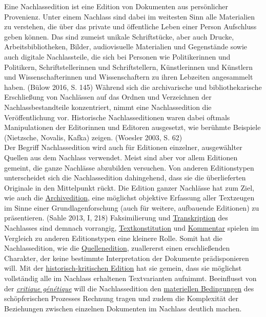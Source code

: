 \documentclass{article}
\begin{document}
    Eine Nachlassedition ist eine Edition von Dokumenten aus persönlicher Provenienz.
                  Unter einem Nachlass sind dabei im weitesten Sinn alle Materialien zu verstehen,
                  die über das private und öffentliche Leben einer Person Aufschluss geben können.
                  Das sind zumeist unikale Schriftstücke, aber auch Drucke, Arbeitsbibliotheken,
                  Bilder, audiovisuelle Materialien und Gegenstände sowie auch digitale
                  Nachlassteile, die sich bei Personen wie Politikerinnen und Politikern,
                  Schriftstellerinnen und Schriftstellern, Künstlerinnen und Künstlern und
                  Wissenschafterinnen und Wissenschaftern zu ihren Lebzeiten angesammelt haben.
                     (Bülow 2016, S. 145) Während sich die archivarische und
                  bibliothekarische Erschließung von Nachlässen auf das Ordnen und Verzeichnen der
                  Nachlassbestandteile konzentriert, nimmt eine Nachlassedition die Veröffentlichung
                  vor. Historische Nachlasseditionen waren dabei oftmals Manipulationen der
                  Editorinnen und Editoren ausgesetzt, wie berühmte Beispiele (Nietzsche, Novalis,
                  Kafka) zeigen. (Woesler 2003, S. 62)\\
            
        Der Begriff Nachlassedition wird auch für Editionen einzelner, ausgewählter
                  Quellen aus dem Nachlass verwendet. Meist sind aber vor allem Editionen gemeint,
                  die ganze Nachlässe abzubilden versuchen. Von anderen Editionstypen unterscheidet
                  sich die Nachlassedition dahingehend, dass sie die überlieferten Originale in den
                  Mittelpunkt rückt. Die Edition ganzer Nachlässe hat zum Ziel, wie auch die \href{http://gams.uni-graz.at/o:konde.33}{Archivedition}, eine möglichst
                  objektive Erfassung aller Textzeugen im Sinne einer Grundlagenforschung (auch für
                  weitere, aufbauende Editionen) zu präsentieren. (Sahle 2013, I, 218)
                  Faksimilierung und \href{http://gams.uni-graz.at/o:konde.197}{Transkription}
                  des Nachlasses sind demnach vorrangig, \href{http://gams.uni-graz.at/o:konde.28}{Textkonstitution} und \href{http://gams.uni-graz.at/o:konde.34}{Kommentar} spielen im Vergleich zu anderen Editionstypen eine kleinere
                  Rolle. Somit hat die Nachlassedition, wie die \href{http://gams.uni-graz.at/o:konde.160}{Quellenedition}, zuallererst einen erschließenden
                  Charakter, der keine bestimmte Interpretation der Dokumente prädisponieren will.
                  Mit der \href{http://gams.uni-graz.at/o:konde.93}{historisch-kritischen
                     Edition} hat sie gemein, dass sie möglichst vollständig alle im Nachlass
                  erhaltenen Textvarianten aufnimmt. Beeinflusst von der \emph{\href{http://gams.uni-graz.at/o:konde.46}{critique génétique}} will die Nachlassedition den \href{http://gams.uni-graz.at/o:konde.127}{materiellen Bedingungen} des schöpferischen Prozesses Rechnung tragen und
                  zudem die Komplexität der Beziehungen zwischen einzelnen Dokumenten im Nachlass
                  deutlich machen. \\
            
\end{document}
